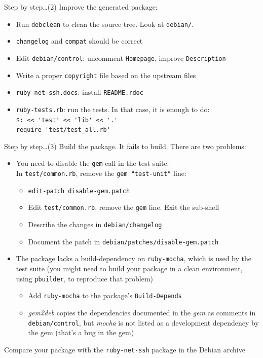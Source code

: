\documentclass[10pt,final]{beamer}
\begin{document}
\begin{frame}[fragile]{Step by step\ldots (2)}
Improve the generated package:
\begin{itemize}
	\item Run \texttt{debclean} to clean the source tree. Look at \texttt{debian/}.
		\hbr
	\item \texttt{changelog} and \texttt{compat} should be correct
		\hbr
	\item Edit \texttt{debian/control}: uncomment \texttt{Homepage}, improve \texttt{Description}
		\hbr
	\item Write a proper \texttt{copyright} file based on the upstream files
		\hbr
	\item \texttt{ruby-net-ssh.docs}: install \texttt{README.rdoc}
		\hbr
	\item \texttt{ruby-tests.rb}: run the tests. In that case, it is enough to do:\\
		\verb+$: << 'test' << 'lib' << '.'+\\
		\verb+require 'test/test_all.rb'+
\end{itemize}
\end{frame}

\begin{frame}[fragile]{Step by step\ldots (3)}
Build the package.
It fails to build. There are two problems:
\begin{itemize}
	\item You need to disable the \texttt{gem} call in the test suite.\\
	In \texttt{test/common.rb}, remove the \verb+gem "test-unit"+ line:
		\begin{itemize}
			\item \texttt{edit-patch disable-gem.patch}
			\item Edit \texttt{test/common.rb}, remove the \texttt{gem} line. Exit the sub-shell
			\item Describe the changes in \texttt{debian/changelog}
			\item Document the patch in \texttt{debian/patches/disable-gem.patch}
		\end{itemize}
		\hbr

	\item The package lacks a build-dependency on \texttt{ruby-mocha},
		which is used by the test suite (you might need to build your
		package in a clean environment, using \texttt{pbuilder}, to
		reproduce that problem)

		\begin{itemize}
			\item Add \texttt{ruby-mocha} to the package's \texttt{Build-Depends}

			\item \textsl{gem2deb} copies the dependencies
				documented in the \textsl{gem} as comments in
				\texttt{debian/control}, but \textsl{mocha} is
				not listed as a development dependency by the
				gem (that's a bug in the gem)
		\end{itemize}
\end{itemize}
\hbr
Compare your package with the \texttt{ruby-net-ssh} package in the Debian archive
\end{frame}
\end{document}
